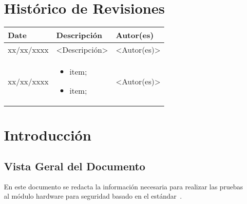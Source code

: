 \documentclass{article}
\begin{document}

\capa
\newpage

\section*{\center Histórico de Revisiones}
  \vspace*{1cm}
  \begin{table}[ht]
    \centering
    \begin{tabular}[pos]{|m{2cm} | m{7.2cm} | m{3.8cm}|} 
      \hline
      \cellcolor[gray]{0.9}
      \textbf{Date} & \cellcolor[gray]{0.9}\textbf{Descripción} & \cellcolor[gray]{0.9}\textbf{Autor(es)}\\ \hline
      \hline
      \small xx/xx/xxxx & \small <Descripción> & \small <Autor(es)> \\ \hline      
      \small xx/xx/xxxx &
      \begin{small}
        \begin{itemize}
          \item item;
          \item item;
        \end{itemize}
      \end{small} & \small <Autor(es)> \\ \hline 
    \end{tabular}
  \end{table}

\newpage

\tableofcontents
\newpage

\section{Introducción}

\subsection{Vista Geral del Documento}
En este documento se redacta la información necesaria para realizar las pruebas al módulo hardware para seguridad basado en el estándar~\cite{1059-1993-std:1994}.
\end{document}
